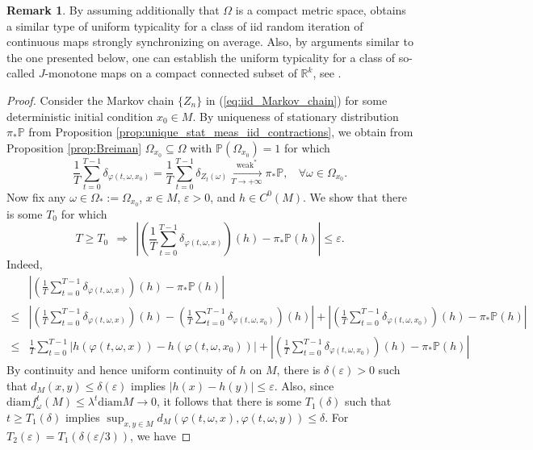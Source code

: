 \documentclass[a4paper]{article}
\theoremstyle{plain}
\theoremstyle{definition}
\newtheorem{rem}[theorem]{Remark}
\newcommand{\PP}{\mathbb{P}}
\newcommand{\R}{\mathbb{R}}
\begin{document}
\begin{rem}\label{rem:beyond_contractions}
	By assuming additionally that $\Omega$ is a compact metric space, \cite{Matias2020} obtains a similar type of uniform typicality for a class of iid random iteration of continuous maps strongly synchronizing on average. Also, by arguments similar to the one presented below, one can establish the uniform typicality for a class of so-called $J$-monotone maps on a compact connected subset of $\R^k$, see \cite[Theorem 2]{Matias2021}. 
\end{rem}


\begin{proof}
	Consider the Markov chain $\{Z_n\}$ in (\ref{eq:iid_Markov_chain}) 
	for some deterministic initial condition $x_0\in M$. 
	By uniqueness of stationary distribution $\pi_{*}\PP$ from Proposition \ref{prop:unique_stat_meas_iid_contractions}, we obtain from Proposition \ref{prop:Breiman} $\Omega_{x_0}\subseteq \Omega$ with $\PP(\Omega_{x_0})=1$ for which
	$$\frac{1}{T} \sum_{t=0}^{T-1} \delta_{\varphi(t,\omega,x_0)}= \frac{1}{T} \sum_{t=0}^{T-1} \delta_{Z_t(\omega)}\xrightarrow[T\to+\infty]{\text{weak}^*} \pi_{*}\PP,~~~~\forall \omega\in\Omega_{x_0}.$$
	Now fix any $\omega\in\Omega_*:=\Omega_{x_0}$, $x\in M$, $\varepsilon>0$, and $h\in C^0(M)$. We show that there is some $T_0$ for which
	$$T\geq T_0~~\Rightarrow~~\left|\left(\frac{1}{T} \sum_{t=0}^{T-1} \delta_{\varphi(t,\omega,x)}\right)(h) - \pi_{*}\PP(h)\right|\leq \varepsilon.$$
	Indeed,
	\begin{align*}
		&	\left|\left(\frac{1}{T} \sum_{t=0}^{T-1} \delta_{\varphi(t,\omega,x)}\right)(h) - \pi_{*}\PP(h)\right|\\
		\leq&  \left|\left(\frac{1}{T} \sum_{t=0}^{T-1} \delta_{\varphi(t,\omega,x)}\right)(h) - \left(\frac{1}{T} \sum_{t=0}^{T-1} \delta_{\varphi(t,\omega,x_0)}\right)(h) \right| + \left|\left(\frac{1}{T} \sum_{t=0}^{T-1} \delta_{\varphi(t,\omega,x_0)}\right)(h) - \pi_{*}\PP(h)\right|\\
		\leq& \frac{1}{T} \sum_{t=0}^{T-1} |h(\varphi(t,\omega,x)) - h(\varphi(t,\omega,x_0))| + \left|\left(\frac{1}{T} \sum_{t=0}^{T-1} \delta_{\varphi(t,\omega,x_0)}\right)(h) - \pi_{*}\PP(h)\right|
	\end{align*}
	By continuity and hence uniform continuity of $h$ on $M$, there is $\delta(\varepsilon)>0$ such that $d_M(x,y)\leq \delta(\varepsilon)$ implies $|h(x)-h(y)|\leq \varepsilon$. Also, since $\mathrm{diam} f_{\omega}^t(M) \leq \lambda^t \mathrm{diam} M\to 0$, it follows that there is some $T_1(\delta)$ such that $t\geq T_1(\delta)$ implies $\sup_{x,y\in M}d_M(\varphi(t,\omega,x),\varphi(t,\omega,y))\leq \delta$. For $T_2(\varepsilon)=T_1(\delta(\varepsilon/3))$, we have

\end{proof}
\end{document}
